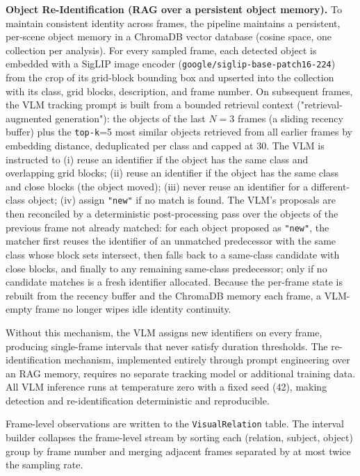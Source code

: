 \textbf{Object Re-Identification (RAG over a persistent object memory).} To maintain consistent identity across frames, the pipeline maintains a persistent, per-scene object memory in a ChromaDB vector database (cosine space, one collection per analysis). For every sampled frame, each detected object is embedded with a SigLIP image encoder\citep{zhai2023siglip} (\texttt{google/siglip-base-patch16-224}) from the crop of its grid-block bounding box and upserted into the collection with its class, grid blocks, description, and frame number. On subsequent frames, the VLM tracking prompt is built from a bounded retrieval context ("retrieval-augmented generation"): the objects of the last $N{=}3$ frames (a sliding recency buffer) plus the \texttt{top{-}k}{=}5 most similar objects retrieved from all earlier frames by embedding distance, deduplicated per class and capped at 30. The VLM is instructed to (i) reuse an identifier if the object has the same class and overlapping grid blocks; (ii) reuse an identifier if the object has the same class and close blocks (the object moved); (iii) never reuse an identifier for a different-class object; (iv) assign \texttt{"new"} if no match is found. The VLM's proposals are then reconciled by a deterministic post-processing pass over the objects of the previous frame not already matched: for each object proposed as \texttt{"new"}, the matcher first reuses the identifier of an unmatched predecessor with the same class whose block sets intersect, then falls back to a same-class candidate with close blocks, and finally to any remaining same-class predecessor; only if no candidate matches is a fresh identifier allocated. Because the per-frame state is rebuilt from the recency buffer and the ChromaDB memory each frame, a VLM-empty frame no longer wipes idle identity continuity.

Without this mechanism, the VLM assigns new identifiers on every frame, producing single-frame intervals that never satisfy duration thresholds. The re-identification mechanism, implemented entirely through prompt engineering over an RAG memory, requires no separate tracking model or additional training data. All VLM inference runs at temperature zero with a fixed seed (42), making detection and re-identification deterministic and reproducible.

Frame-level observations are written to the \texttt{VisualRelation} table. The interval builder collapses the frame-level stream by sorting each (relation, subject, object) group by frame number and merging adjacent frames separated by at most twice the sampling rate.

